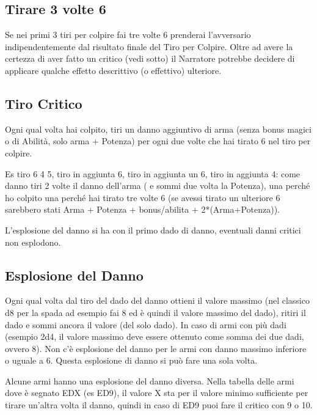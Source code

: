 \documentclass[a4paper,11pt,twoside,openany]{book}
\begin{document}
\subsection{Tirare 3 volte 6}

Se nei primi 3 tiri per colpire fai tre volte 6 prenderai l'avversario indipendentemente dal risultato finale del Tiro per Colpire. Oltre ad avere la certezza di aver fatto un critico (vedi sotto) il Narratore potrebbe decidere di applicare qualche effetto descrittivo (o effettivo) ulteriore.

\subsection{Tiro Critico}

Ogni qual volta hai colpito, tiri un danno aggiuntivo di arma (senza bonus magici o di Abilità, solo arma + Potenza) per ogni due volte che hai tirato 6 nel tiro per colpire.

Es tiro 6 4 5, tiro in aggiunta 6, tiro in aggiunta un 6, tiro in aggiunta 4: come danno tiri 2 volte il danno dell'arma ( e sommi due volta la Potenza), una perché ho colpito una perché hai tirato tre volte 6 (se avessi tirato un ulteriore 6 sarebbero stati Arma + Potenza + bonus/abilita + 2{*}(Arma+Potenza)).

L'esplosione del danno si ha con il primo dado di danno, eventuali danni critici non esplodono.

\subsection{Esplosione del Danno}

Ogni qual volta dal tiro del dado del danno ottieni il valore massimo (nel classico d8 per la spada ad esempio fai 8 ed è quindi il valore massimo del dado), ritiri il dado e sommi ancora il valore (del solo dado). In caso di armi con più dadi (esempio 2d4, il valore massimo deve essere ottenuto come somma dei due dadi, ovvero 8). Non c'è esplosione del danno per le armi con danno massimo inferiore o uguale a 6. Questa esplosione di danno si può fare una sola volta.

Alcune armi hanno una esplosione del danno diversa. Nella tabella delle armi dove è segnato EDX (es ED9), il valore X sta per il valore minimo sufficiente per tirare un'altra volta il danno, quindi in caso di ED9 puoi fare il critico con 9 o 10.
\end{document}
